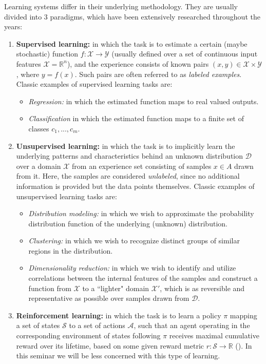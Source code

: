 \documentclass{article}
\begin{document}
\medskip
\noindent
Learning systems differ in their underlying methodology. They are usually divided into 3 paradigms, which have been extensively researched throughout the years:
\begin{enumerate}
    \item \textbf{Supervised learning:}
        in which the task is to estimate a certain (maybe stochastic) function $f: \mathcal{X} \rightarrow \mathcal{Y}$ (usually defined over a set of continuous input features $\mathcal{X}=\mathbb{R}^n$), and the experience consists of known pairs $(x,y)\in \mathcal{X} \times \mathcal{Y}$, where $y=f(x)$. Such pairs are often referred to as \emph{labeled examples}. Classic examples of supervised learning tasks are:
        \begin{itemize}
            \item \emph{Regression:}
                    in which the estimated function maps to real valued outputs.
            \item \emph{Classification}
                    in which the estimated function maps to a finite set of classes $c_1,...,c_m$.
        \end{itemize}

    \item \textbf{Unsupervised learning:}
        in which the task is to implicitly learn the underlying patterns and characteristics behind an unknown distribution $\mathcal{D}$ over a domain $\mathcal{X}$ from an experience set consisting of samples $x \in A$ drawn from it. Here, the samples are considered \emph{unlabeled}, since no additional information is provided but the data points themselves. Classic examples of unsupervised learning tasks are:
        \begin{itemize}
            \item \emph{Distribution modeling:}
                in which we wish to approximate the probability distribution function of the underlying (unknown) distribution.
            \item \emph{Clustering:}
                in which we wish to recognize distinct groups of similar regions in the distribution.
            \item \emph{Dimensionality reduction:}
                in which we wish to identify and utilize correlations between the internal features of the samples and construct a function from $\mathcal{X}$ to a ``lighter" domain $\mathcal{X}'$, which is as reversible and representative as possible over samples drawn from $\mathcal{D}$.  
        \end{itemize}

    \item \textbf{Reinforcement learning:} 
        in which the task is to learn a policy $\pi$ mapping a set of states $\mathcal{S}$ to a set of actions $\mathcal{A}$, such that an agent operating in the corresponding environment of states following $\pi$ receives maximal cumulative reward over its lifetime, based on some given reward metric $r: \mathcal{S} \rightarrow \mathcal{\mathbb{R}}$ (\citet{kaelbling1996reinforcement}). In this seminar we will be less concerned with this type of learning.
        
\end{enumerate}
\end{document}
